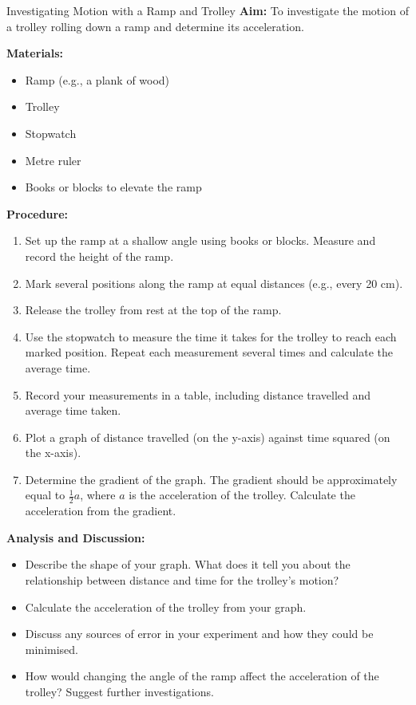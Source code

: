 \begin{investigation}{Investigating Motion with a Ramp and Trolley}
\textbf{Aim:} To investigate the motion of a trolley rolling down a ramp and determine its acceleration.

\textbf{Materials:}
\begin{itemize}
    \item Ramp (e.g., a plank of wood)
    \item Trolley
    \item Stopwatch
    \item Metre ruler
    \item Books or blocks to elevate the ramp
\end{itemize}

\textbf{Procedure:}
\begin{enumerate}
    \item Set up the ramp at a shallow angle using books or blocks. Measure and record the height of the ramp.
    \item Mark several positions along the ramp at equal distances (e.g., every 20 cm).
    \item Release the trolley from rest at the top of the ramp.
    \item Use the stopwatch to measure the time it takes for the trolley to reach each marked position. Repeat each measurement several times and calculate the average time.
    \item Record your measurements in a table, including distance travelled and average time taken.
    \item Plot a graph of distance travelled (on the y-axis) against time squared (on the x-axis).
    \item Determine the gradient of the graph. The gradient should be approximately equal to $\frac{1}{2}a$, where $a$ is the acceleration of the trolley. Calculate the acceleration from the gradient.
\end{enumerate}

\textbf{Analysis and Discussion:}
\begin{itemize}
    \item Describe the shape of your graph. What does it tell you about the relationship between distance and time for the trolley's motion?
    \item Calculate the acceleration of the trolley from your graph.
    \item Discuss any sources of error in your experiment and how they could be minimised.
    \item How would changing the angle of the ramp affect the acceleration of the trolley?  Suggest further investigations.
\end{itemize}
\end{investigation}


